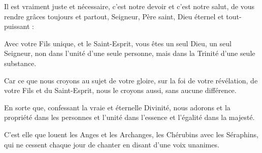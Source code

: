 Il est vraiment juste et nécessaire,
c’est notre devoir et c’est notre salut,
de vous rendre grâces toujours et partout,
Seigneur, Père saint, Dieu éternel et tout-puissant :

Avec votre Fils unique, et le Saint-Esprit,
vous êtes un seul Dieu, un seul Seigneur,
non dans l’unité d’une seule personne,
mais dans la Trinité d’une seule substance.

Car ce que nous croyons au sujet de votre gloire,
sur la foi de votre révélation,
de votre Fils et du Saint-Esprit,
nous le croyons aussi, sans aucune différence.

En sorte que, confessant la vraie et éternelle Divinité,
nous adorons et la propriété dans les personnes
et l’unité dans l’essence
et l’égalité dans la majesté.

C’est elle que louent les Anges et les Archanges,
les Chérubins avec les Séraphins,
qui ne cessent chaque jour de chanter
en disant d’une voix unanimes.
